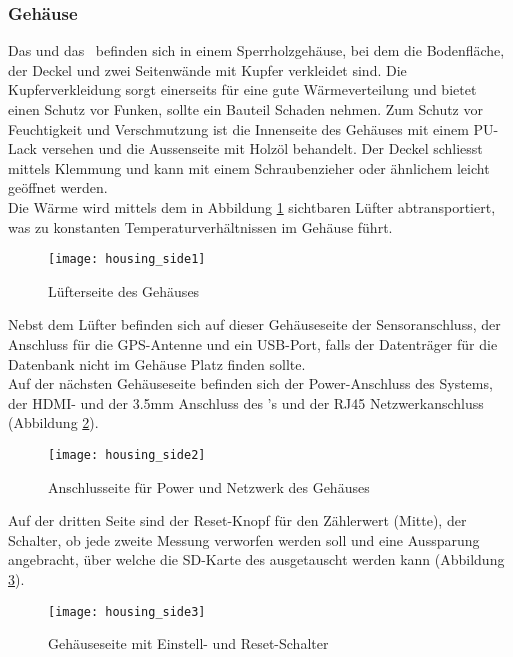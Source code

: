 \subsubsection{Gehäuse}
Das \rpi und das \hwb\ befinden sich in einem Sperrholzgehäuse, bei dem die Bodenfläche, der Deckel und zwei Seitenwände mit Kupfer verkleidet sind. 
Die Kupferverkleidung sorgt einerseits für eine gute Wärmeverteilung und bietet einen Schutz vor Funken, sollte ein Bauteil Schaden nehmen.
Zum Schutz vor Feuchtigkeit und Verschmutzung ist die Innenseite des Gehäuses mit einem PU-Lack versehen und die Aussenseite mit Holzöl behandelt. 
Der Deckel schliesst mittels Klemmung und kann mit einem Schraubenzieher oder ähnlichem leicht geöffnet werden.\\
Die Wärme wird mittels dem in Abbildung \ref{fig:housing_side1} sichtbaren Lüfter abtransportiert, was zu konstanten Temperaturverhältnissen im Gehäuse führt.
\begin{figure}[H]
	\centering
	\texttt{[image: housing\_side1]}
	\caption{Lüfterseite des Gehäuses}
	\label{fig:housing_side1}
\end{figure}
\noindent Nebst dem Lüfter befinden sich auf dieser Gehäuseseite der Sensoranschluss, der Anschluss für die GPS-Antenne und ein USB-Port, falls der Datenträger für die Datenbank nicht im Gehäuse Platz finden sollte.\\
Auf der nächsten Gehäuseseite befinden sich der Power-Anschluss des Systems, der HDMI- und der 3.5mm Anschluss des \rpi{}'s und der RJ45 Netzwerkanschluss (Abbildung \ref{fig:housing_side2}).
\begin{figure}[H]
	\centering
	\texttt{[image: housing\_side2]}
	\caption{Anschlusseite für Power und Netzwerk des Gehäuses}
	\label{fig:housing_side2}
\end{figure}
Auf der dritten Seite sind der Reset-Knopf für den Zählerwert (Mitte), der Schalter, ob jede zweite Messung verworfen werden soll und eine Aussparung angebracht, über welche die SD-Karte des \rpi ausgetauscht werden kann (Abbildung \ref{fig:housing_side3}).
\begin{figure}[H]
	\centering
	\texttt{[image: housing\_side3]}
	\caption{Gehäuseseite mit Einstell- und Reset-Schalter}
	\label{fig:housing_side3}
\end{figure}